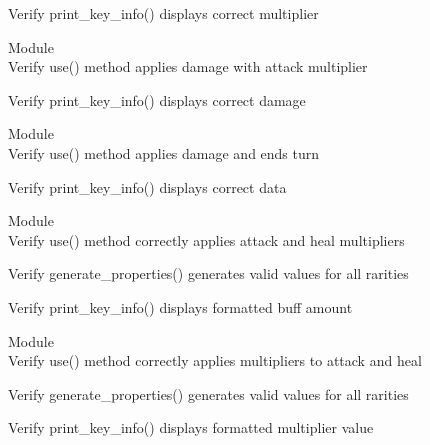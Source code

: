 \begin{DoxyRefList}
\label{test__test000046}%
%
Verify print\+\_\+key\+\_\+info() displays correct multiplier  


\item[Module \doxylink{group___attack_spell}{Attack\+Spell} ]\hfill \\
\label{test__test000011}%
%
Verify use() method applies damage with attack multiplier  



\label{test__test000012}%
%
Verify print\+\_\+key\+\_\+info() displays correct damage  


\item[Module \doxylink{group___beast_card}{Beast\+Card} ]\hfill \\
\label{test__test000033}%
%
Verify use() method applies damage and ends turn  



\label{test__test000034}%
%
Verify print\+\_\+key\+\_\+info() displays correct data  


\item[Module \doxylink{group___buff_card}{Buff\+Card} ]\hfill \\
\label{test__test000055}%
%
Verify use() method correctly applies attack and heal multipliers  



\label{test__test000056}%
%
Verify generate\+\_\+properties() generates valid values for all rarities  



\label{test__test000057}%
%
Verify print\+\_\+key\+\_\+info() displays formatted buff amount  


\item[Module \doxylink{group___buff_spell}{Buff\+Spell} ]\hfill \\
\label{test__test000023}%
%
Verify use() method correctly applies multipliers to attack and heal  



\label{test__test000024}%
%
Verify generate\+\_\+properties() generates valid values for all rarities  



\label{test__test000025}%
%
Verify print\+\_\+key\+\_\+info() displays formatted multiplier value  



\end{DoxyRefList}

